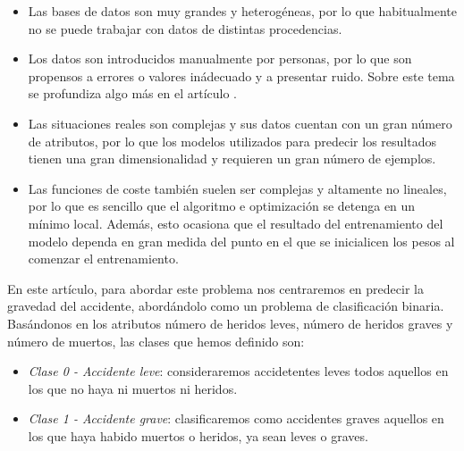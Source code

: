 \documentclass[journal,twoside]{JoPhA}
\begin{document}
\begin{itemize}
	\item Las bases de datos son muy grandes y heterogéneas, por lo que habitualmente no se puede trabajar con datos de distintas procedencias. \\
	
	\item Los datos son introducidos manualmente por personas, por lo que son propensos a errores o valores inádecuado y a presentar ruido. Sobre este tema se profundiza algo más en el artículo \cite{analisis_datos}. \\

	\item Las situaciones reales son complejas y sus datos cuentan con un gran número de atributos, por lo que los modelos utilizados para predecir los resultados tienen una gran dimensionalidad y requieren un gran número de ejemplos. \\
	
	\item Las funciones de coste también suelen ser complejas y altamente no lineales, por lo que es sencillo que el algoritmo e optimización se detenga en un mínimo local. Además, esto ocasiona que el resultado del entrenamiento del modelo dependa en gran medida del punto en el que se inicialicen los pesos al comenzar el entrenamiento. \\
\end{itemize}


En este artículo, para abordar este problema nos centraremos en predecir la gravedad del accidente, abordándolo como un problema de clasificación binaria. Basándonos en los atributos número de heridos leves, número de heridos graves y número de muertos, las clases que hemos definido son: \\

\begin{itemize}
	\item \textit{Clase 0 - Accidente leve}: consideraremos accidetentes leves todos aquellos en los que no haya ni muertos ni heridos.
	\item \textit{Clase 1 - Accidente grave}: clasificaremos como accidentes graves aquellos en los que haya habido muertos o heridos, ya sean leves o graves. \\ 
\end{itemize}
\end{document}
